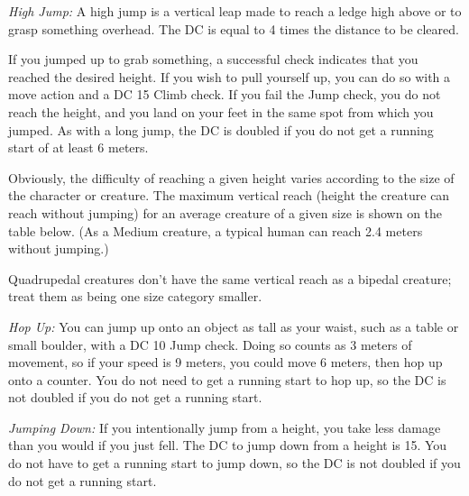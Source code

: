 \textit{High Jump:} A high jump is a vertical leap made to reach a ledge high above or to grasp something overhead. The DC is equal to 4 times the distance to be cleared.

If you jumped up to grab something, a successful check indicates that you reached the desired height. If you wish to pull yourself up, you can do so with a move action and a DC 15 Climb check. If you fail the Jump check, you do not reach the height, and you land on your feet in the same spot from which you jumped. As with a long jump, the DC is doubled if you do not get a running start of at least 6 meters.


Obviously, the difficulty of reaching a given height varies according to the size of the character or creature. The maximum vertical reach (height the creature can reach without jumping) for an average creature of a given size is shown on the table below. (As a Medium creature, a typical human can reach 2.4 meters without jumping.)

Quadrupedal creatures don't have the same vertical reach as a bipedal creature; treat them as being one size category smaller.

\textit{Hop Up:} You can jump up onto an object as tall as your waist, such as a table or small boulder, with a DC 10 Jump check. Doing so counts as 3 meters of movement, so if your speed is 9 meters, you could move 6 meters, then hop up onto a counter. You do not need to get a running start to hop up, so the DC is not doubled if you do not get a running start.

\textit{Jumping Down:} If you intentionally jump from a height, you take less damage than you would if you just fell. The DC to jump down from a height is 15. You do not have to get a running start to jump down, so the DC is not doubled if you do not get a running start.

